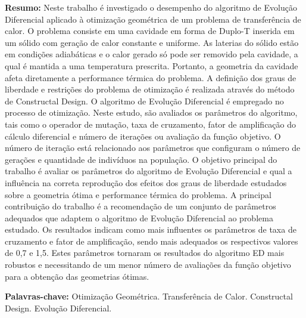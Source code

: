 \documentclass[12pt,A4,A4pt]{article}
\begin{document}
\begin{flushleft}
{\small {} \justify
\textbf{Resumo:} Neste trabalho é investigado o desempenho do algoritmo de Evolução Diferencial aplicado à otimização geométrica de um problema de transferência de calor. O problema consiste em uma cavidade em forma de Duplo-T inserida em um sólido com geração de calor constante e uniforme. As laterias do sólido estão em condições adiabáticas e o calor gerado só pode ser removido pela cavidade, a qual é mantida a uma temperatura prescrita. Portanto, a geometria da cavidade afeta diretamente a performance térmica do problema. A definição dos graus de liberdade e restrições do problema de otimização é realizada através do método de Constructal Design. O algoritmo de Evolução Diferencial é empregado no processo de otimização. Neste estudo, são avaliados os parâmetros do algoritmo, tais como o operador de mutação, taxa de cruzamento, fator de amplificação do cálculo diferencial e número de iterações ou avaliação da função objetivo. O número de iteração está relacionado aos parâmetros que configuram o número de gerações e quantidade de indivíduos na população.  O objetivo principal do trabalho é avaliar os parâmetros do algoritmo de Evolução Diferencial e qual a influência na correta reprodução dos efeitos dos graus de liberdade estudados sobre a geometria ótima e performance térmica do problema. A principal contribuição do trabalho é a recomendação de um conjunto de parâmetros adequados que adaptem o algoritmo de Evolução Diferencial ao problema estudado. Os resultados indicam como mais influentes os parâmetros de taxa de cruzamento e fator de amplificação, sendo mais adequados os  respectivos valores de 0,7 e 1,5. Estes parâmetros tornaram os resultados do algoritmo ED mais robustos e necessitando de um menor número de avaliações da função objetivo para a obtenção das geometrias ótimas.

\vspace{0.3cm}

\noindent\textbf{Palavras-chave:} Otimização Geométrica. Transferência de Calor. Constructal Design. Evolução Diferencial.}
\end{flushleft}

\end{document}
